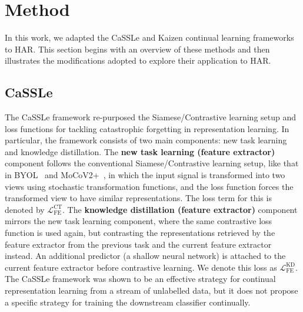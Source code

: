 \section{Method}
In this work, we adapted the CaSSLe \cite{fini2022self} and Kaizen \cite{tang2023practical} continual learning frameworks to HAR. This section begins with an overview of these methods and then illustrates the modifications adopted to explore their application to HAR.

\subsection{CaSSLe}
The CaSSLe framework \cite{fini2022self} re-purposed the Siamese/Contrastive learning setup and loss functions for tackling catastrophic forgetting in representation learning. In particular, the framework consists of two main components: new task learning and knowledge distillation.
The \textbf{new task learning (feature extractor)} component follows the conventional Siamese/Contrastive learning setup, like that in BYOL~\cite{grill2020bootstrap} and MoCoV2+~\cite{chen2020improved, he2020momentum}, in which the input signal is transformed into two views using stochastic transformation functions, and the loss function forces the transformed view to have similar representations. The loss term for this is denoted by $\mathcal{L}^{\mathrm{CT}}_{\mathrm{FE}}$.
The \textbf{knowledge distillation (feature extractor)} component mirrors the new task learning component, where the same contrastive loss function is used again, but contrasting the representations retrieved by the feature extractor from the previous task and the current feature extractor instead. An additional predictor (a shallow neural network) is attached to the current feature extractor before contrastive learning. We denote this loss as $\mathcal{L}^{\mathrm{KD}}_{\mathrm{FE}}$.
The CaSSLe framework was shown to be an effective strategy for continual representation learning from a stream of unlabelled data, but it does not propose a specific strategy for training the downstream classifier continually.

